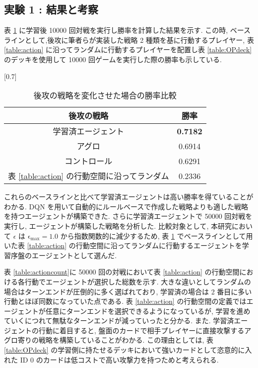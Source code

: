 \documentclass[twocolumn]{jarticle}
\begin{document}
     \subsection{実験 1 : 結果と考察}
     表 \ref{table:winratejikken1} に学習後 10000 回対戦を実行し勝率を計算した結果を示す. この時, ベースラインとして,後攻に筆者らが実装した戦略 2 種類を基に行動するプレイヤー, 表 \ref{table:action} に沿ってランダムに行動するプレイヤーを配置し表 \ref{table:OPdeck} のデッキを使用して 10000 回ゲームを実行した際の勝率も示している. 
     \begin{table}[t]
       \centering
       \caption{後攻の戦略を変化させた場合の勝率比較}
       \vspace{-0.3cm}
       \label{table:winratejikken1}
       \scalebox{0.7}[0.7]{
         \begin{tabular}{|c|c|}
            \hline
            後攻の戦略        & 勝率     \\ \hline \hline
            学習済エージェント    & \textbf{0.7182} \\ \hline
            アグロ          & 0.6914 \\ \hline
            コントロール       & 0.6291 \\ \hline
            表 \ref{table:action} の行動空間に沿ってランダム & 0.2336       \\ \hline
            \end{tabular}
       }
       \end{table}
       これらのベースラインと比べて学習済エージェントは高い勝率を得ていることがわかる. DQN を用いて自動的にルールベースで作成した戦略よりも適した戦略を持つエージェントが構築できた.
       さらに学習済エージェントで 50000 回対戦を実行し, エージェントが構築した戦略を分析した.
       比較対象として, 本研究において $\epsilon$ は $\mathrm{\epsilon_{max}} = 1.0$ から指数関数的に減少するため, 表 \ref{table:winratejikken1} でベースラインとして用いた表 \ref{table:action} の行動空間に沿ってランダムに行動するエージェントを学習序盤のエージェントとして選んだ.\par 
       表 \ref{table:actioncount}に 50000 回の対戦において表 \ref{table:action} の行動空間における各行動でエージェントが選択した総数を示す. 大きな違いとしてランダムの場合はターンエンドが圧倒的に多く選ばれており, 学習済の場合は 2 番目に多い行動とほぼ同数になっていた点である. 表 \ref{table:action} の行動空間の定義ではエージェントが任意にターンエンドを選択できるようになっているが, 学習を進めていくにつれて無駄なターンエンドが減っていったと分かる.
       また. 学習済エージェントの行動に着目すると, 盤面のカードで相手プレイヤーに直接攻撃するアグロ寄りの戦略を構築していることがわかる. この理由としては, 表 \ref{table:OPdeck} の学習側に持たせるデッキにおいて強いカードとして恣意的に入れた ID 0 のカードは低コストで高い攻撃力を持つためと考えられる. \par
\end{document}
